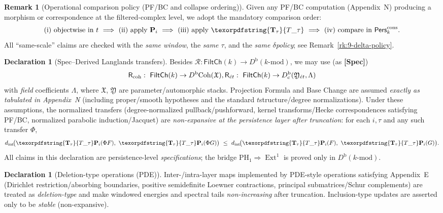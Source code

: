 \documentclass[11pt]{article}
\DeclareMathOperator{\Ext}{Ext}
\DeclareRobustCommand{\hyp}{\nobreakdash-}
\newcommand{\Pers}{\mathsf{Pers}}
\newcommand{\Rfun}{\mathcal{R}}
\numberwithin{equation}{section}
\theoremstyle{definition}
\newtheorem{remark}[theorem]{Remark}
\newtheorem{declaration}[theorem]{Declaration}
\DeclareRobustCommand{\FiltCh}[1]{\mathsf{FiltCh}(#1)}
\DeclareRobustCommand{\Perskft}{\Pers^{\mathrm{cons}}_{k}}
\DeclareRobustCommand{\Ttau}{\texorpdfstring{\ensuremath{\mathbf{T}_{\tau}}}{T\_\tau}}
\providecommand{\n}{\unskip\space}
\begin{document}
\begin{remark}[Operational comparison policy (PF/BC and collapse ordering)]\label{rk:9-operational}
Given any PF/BC computation (Appendix~N) producing a morphism or correspondence at the filtered\hyp complex level, we adopt the mandatory comparison order:
\[
\text{(i) objectwise in \(t\)}\ \Longrightarrow\ \text{(ii) apply }\mathbf{P}_i\ \Longrightarrow\ \text{(iii) apply }\Ttau\ \Longrightarrow\ \text{(iv) compare in }\Perskft.
\]
All “same\hyp scale” claims are checked with the \emph{same window}, the \emph{same \(\tau\)}, and the \emph{same \(\delta\)\nobreakdash policy}; see Remark~\ref{rk:9-delta-policy}.
\end{remark}

\begin{declaration}[Spec–Derived Langlands transfers]\label{spec:9-derived}
Besides \(\Rfun:\FiltCh{k}\!\to\!D^{\mathrm{b}}(k\text{-mod})\), we may use (as \textbf{[Spec]})
\[
\mathsf{R}_{\mathrm{coh}}:\ \FiltCh{k}\to D^{\mathrm{b}}\!\operatorname{Coh}(\mathfrak{X}),\qquad\n\mathsf{R}_{\acute{e}t}:\ \FiltCh{k}\to D^{\mathrm{b}}_{\mathrm{c}}(\mathfrak{Y}_{\acute{e}t},\Lambda)
\]
with \emph{field} coefficients \(\Lambda\), where \(\mathfrak{X}\), \(\mathfrak{Y}\) are parameter/automorphic stacks.
Projection Formula and Base Change are assumed \emph{exactly as tabulated in Appendix~N} (including proper/smooth hypotheses and the standard \(t\)\nobreakdash structure/degree normalizations).
Under these assumptions, the normalized transfers (degree\hyp normalized pullback/pushforward, kernel transforms/Hecke correspondences satisfying PF/BC, normalized parabolic induction/Jacquet) are \emph{non\hyp expansive at the persistence layer after truncation}: for each \(i,\tau\) and any such transfer \(\Phi\),
\[
d_{\mathrm{int}}\!\big(\Ttau\mathbf{P}_i(\Phi F),\ \Ttau\mathbf{P}_i(\Phi G)\big)\ \le\ d_{\mathrm{int}}\!\big(\Ttau\mathbf{P}_i(F),\ \Ttau\mathbf{P}_i(G)\big).
\]
All claims in this declaration are persistence\hyp level \emph{specifications}; the bridge \(\mathrm{PH}_1\Rightarrow\Ext^1\) is proved only in \(D^{\mathrm{b}}(k\text{-mod})\).
\end{declaration}

\begin{declaration}[Deletion\hyp type operations (PDE)]\label{spec:9-pde}
Inter\hyp /intra\hyp layer maps implemented by PDE\hyp style operations satisfying Appendix~E
(Dirichlet restriction/absorbing boundaries, positive semidefinite Loewner contractions, principal submatrices/Schur complements)
are treated as \emph{deletion\hyp type} and make windowed energies and spectral tails \emph{non\hyp increasing} after truncation.
Inclusion\hyp type updates are asserted only to be \emph{stable} (non\hyp expansive).
\end{declaration}
\end{document}
